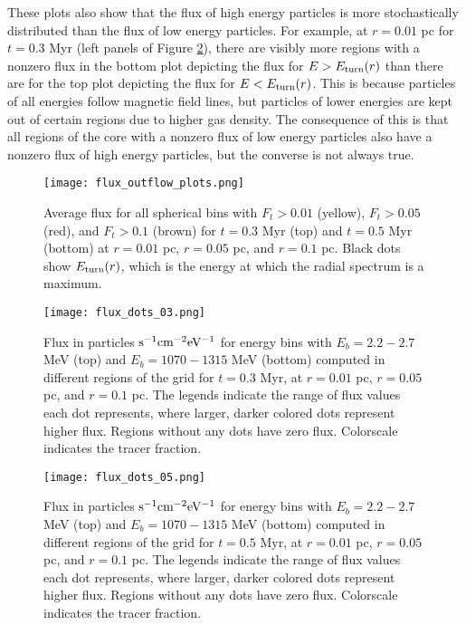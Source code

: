 \documentclass[twocolumn]{aastex63}
\begin{document}
These plots also show that the flux of high energy particles is more stochastically distributed than the flux of low energy particles. For example, at $r=0.01$ pc for $t=0.3$ Myr (left panels of Figure \ref{fig:flux_ebin_dots_t_03}), there are visibly more regions with a nonzero flux in the bottom plot depicting the flux for $E> E_{\rm turn} (r)$ than there are for the top plot depicting the flux for $E< E_{\rm turn} (r)$. This is because particles of all energies follow magnetic field lines, but particles of lower energies are kept out of certain regions due to higher gas density. The consequence of this is that all regions of the core with a nonzero flux of low energy particles also have a nonzero flux of high energy particles, but the converse is not always true.

\begin{figure*}
\centering
\texttt{[image: flux\_outflow\_plots.png]}
\caption{Average flux for all spherical bins with $F_t>0.01$ (yellow), $F_t>0.05$ (red), and $F_t>0.1$ (brown) for $t=0.3$ Myr (top) and $t=0.5$ Myr (bottom) at $r=0.01$ pc, $r=0.05$ pc, and $r=0.1$ pc. Black dots show $E_{\rm turn} (r)$, which is the energy at which the radial spectrum is a maximum.}
\label{fig:flux_outflow}
\end{figure*}

\begin{figure*}
\centering
\texttt{[image: flux\_dots\_03.png]}
\caption{Flux in particles $\rm s^{-1} cm^{-2} eV^{-1}$ for energy bins with $E_b=2.2-2.7$ MeV (top) and $E_b=1070-1315$ MeV (bottom) computed in different regions of the grid for $t=0.3$ Myr, at $r=0.01$ pc, $r=0.05$ pc, and $r=0.1$ pc. The legends indicate the range of flux values each dot represents, where larger, darker colored dots represent higher flux.
Regions without any dots have zero flux. Colorscale indicates the tracer fraction.}
\label{fig:flux_ebin_dots_t_03}
\end{figure*}

\begin{figure*}
\centering
\texttt{[image: flux\_dots\_05.png]}
\caption{Flux in particles $\rm s^{-1} cm^{-2} eV^{-1}$ for energy bins with $E_b=2.2-2.7$ MeV (top) and $E_b=1070-1315$ MeV (bottom) computed in different regions of the grid for $t=0.5$ Myr, at $r=0.01$ pc, $r=0.05$ pc, and $r=0.1$ pc. The legends indicate the range of flux values each dot represents, where larger, darker colored dots represent higher flux. Regions without any dots have zero flux. Colorscale indicates the tracer fraction.}
\label{fig:flux_ebin_dots_t_05}
\end{figure*}
\end{document}
